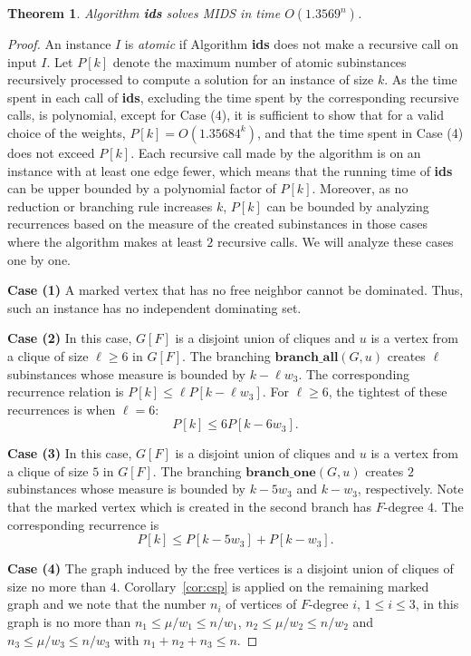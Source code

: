 \documentclass[a4paper,10pt]{article}
\theoremstyle{plain}
\newtheorem{theorem}{Theorem}
\theoremstyle{definition}
\theoremstyle{remark}
\newcommand{\ids}{independent dominating set\xspace}
\newcommand{\MIDSpb}{\textsc{MIDS}\xspace}
\newcommand{\brancha}{\mathbf{branch\_all}}
\newcommand{\brancho}{\mathbf{branch\_one}}
\newcommand{\runtime}{1.3569}
\newcommand{\runtimeprec}{1.35684}
\begin{document}
\begin{theorem}
\label{upperbound}
Algorithm {\bf ids} solves \MIDSpb in time $O(\runtime^n)$.
\end{theorem}
\begin{proof}
An instance $I$ is \emph{atomic} if Algorithm \textbf{ids} does not make a recursive call on input $I$.
Let $P[k]$ denote the maximum number of atomic subinstances recursively processed to compute a
solution for an instance of size $k$. As the time spent in each call of {\bf ids}, excluding the time
spent by the corresponding recursive calls, is polynomial, except for Case (4), it is sufficient to show
that for a valid choice of the weights, $P[k]=O(\runtimeprec^k)$, and that the time spent in Case (4) does not exceed $P[k]$. Each recursive call made
by the algorithm is on an instance with at least one edge fewer, which means that the
running time of {\bf ids} can be upper bounded by a polynomial factor of $P[k]$. Moreover, as no reduction or
branching rule increases $k$, $P[k]$ can be bounded
by analyzing recurrences
based on the measure of the created subinstances in those cases where the algorithm makes
at least $2$ recursive calls.
We will analyze these cases one by one.

{\bf Case (1)}
A marked vertex that has no free neighbor cannot be dominated. Thus, such an instance has no \ids.

{\bf Case (2)}
In this case, $G[F]$ is a disjoint union of cliques and $u$ is a vertex from a clique
of size $\ell \ge 6$ in $G[F]$. The branching $\brancha(G,u)$ creates $\ell$ subinstances
whose measure is bounded by $k-\ell w_3$. The corresponding recurrence relation is
$
P[k] \leq \ell P[k- \ell w_3].
$
For $\ell \ge 6$, the tightest of these recurrences is when $\ell = 6$:
\begin{equation}
P[k] \leq 6 P[k- 6 w_3].
\end{equation}

{\bf Case (3)}
In this case, $G[F]$ is a disjoint union of cliques and $u$ is a vertex from a clique
of size $5$ in $G[F]$. The branching $\brancho(G,u)$ creates $2$ subinstances
whose measure is bounded by $k-5 w_3$ and $k-w_3$, respectively. Note that the marked vertex which is created in the second branch has $F$-degree $4$. The corresponding recurrence is
\begin{equation}
P[k] \leq P[k- 5 w_3] + P[k- w_3].
\end{equation}

{\bf Case (4)} The graph induced by the free vertices is a disjoint union of cliques of size no more
than $4$. Corollary~\ref{cor:csp} is applied on the remaining marked graph and we note that
the number $n_i$ of vertices of $F$-degree $i$, $1\leq i \leq 3$, in this graph is no more than
$n_1\leq \mu /w_1 \leq n /w_1$,
$n_2\leq \mu /w_2 \leq n /w_2$ and
$n_3\leq \mu /w_3 \leq n /w_3$
with $n_1+n_2+n_3 \leq n$.



\end{proof}
\end{document}
